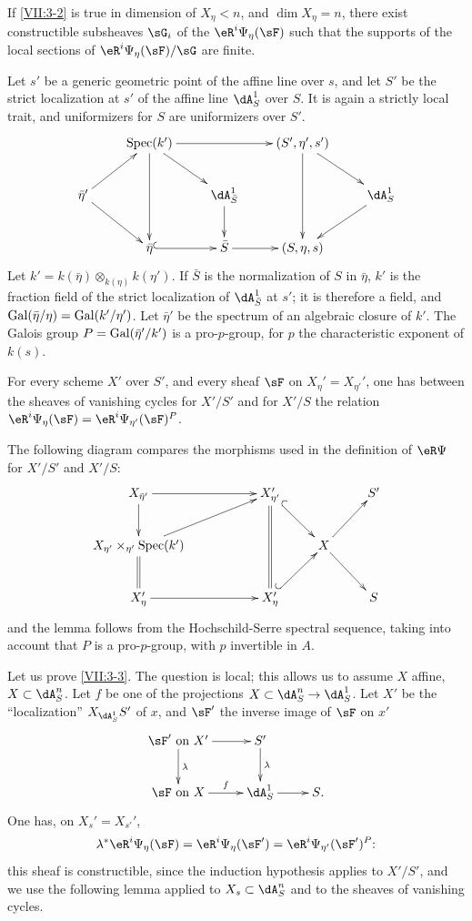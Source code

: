 \begin{lemma_}\label{VII:3-3}
If \ref{VII:3-2} is true in dimension of $X_\eta<n$, and $\dim X_\eta=n$,
there exist constructible subsheaves $\sG_i$ of the $\eR^i \Psi_\eta(\sF)$
such that the supports of the local sections of $\eR^i\Psi_\eta(\sF)/\sG$ are
finite.
\end{lemma_}

Let $s'$ be a generic geometric point of the affine line over $s$,
and let $S'$ be the strict localization at $s'$ of the affine line $\dA_S^1$ over
$S$. It is again a strictly local trait, and uniformizers for $S$
are uniformizers over $S'$.
\[\xymatrix{
  & \spec(k') \ar[rr] \ar[dd] \ar[dr]
    & & (S',\eta',s') \ar[dr] \ar[dd] \\
  \bar\eta' \ar[ur] \ar[dr]
    & & \dA_{\bar S}^1 \ar[d]
    & & \dA_S^1 \ar[dl] \\
  & \bar\eta\ar@{^{(}->}[r]
    & \bar S \ar[r]
    & (S,\eta,s)
}\]
Let $k'=k(\bar\eta)\otimes_{k(\eta)}k(\eta')$. If $\bar S$ is the normalization
of $S$ in $\bar\eta$, $k'$ is the fraction field of the strict localization
of $\dA_{\bar S}^1$ at $s'$; it is therefore a field, and
$\operatorname{Gal}(\bar\eta/\eta)=\operatorname{Gal}(k'/\eta')$. Let $\bar\eta'$ be the spectrum of an
algebraic closure of $k'$. The Galois group $P=\operatorname{Gal}(\bar\eta'/k')$ is
a pro-$p$-group, for $p$ the characteristic exponent of $k(s)$.




\begin{lemma_}\label{VII:3-4}
For every scheme $X'$ over $S'$, and every sheaf $\sF$ on
$X_\eta'=X_{\eta'}'$, one has between the sheaves of vanishing cycles for
$X'/S'$ and for $X'/S$ the relation
$\eR^i \Psi_\eta(\sF) =\eR^i\Psi_{\eta'}(\sF)^P$.
\end{lemma_}

The following diagram compares the morphisms used in the definition of
$\eR\Psi$ for $X'/S'$ and $X'/S$:
\[\xymatrix{
  X_{\bar\eta'} \ar[rr] \ar[d]
    & & X_{\eta'}' \ar@{=}[dd] \ar@{^{(}->}[dr]
    & & S' \\
  X_{\eta'}\times_{\eta'}\spec(k') \ar@{=}[d] \ar[urr]
    & & & X \ar[ur] \ar[dr] \\
  X_\eta' \ar[rr]
    & & X_\eta' \ar@{^{(}->}[ur]
    & & S
}\]
and the lemma follows from the Hochschild-Serre spectral sequence, taking into
account that $P$ is a pro-$p$-group, with $p$ invertible in $A$.

Let us prove \ref{VII:3-3}. The question is local; this allows us to assume $X$
affine, $X\subset \dA_S^n$. Let $f$ be one of the projections
$X\subset \dA_S^n\to \dA_S^1$. Let $X'$ be the ``localization'' $X_{\dA_S^1} S'$ of $x$,
and $\sF'$ the inverse image of $\sF$ on $x'$
\[\xymatrix{
  \sF'\text{ on }X' \ar[r] \ar[d]^-\lambda
    & S' \ar[d]^-\lambda \\
  \sF \text{ on }X \ar[r]^-f
    & \dA_S^1 \ar[r]
    & S \text{.}
}\]
One has, on $X_s'=X_{s'}'$,
\[
  \lambda^\ast \eR^i\Psi_\eta(\sF) = \eR^i \Psi_\eta(\sF') = \eR^i\Psi_{\eta'}(\sF')^P \text{:}
\]
this sheaf is constructible, since the induction hypothesis applies to
$X'/S'$, and we use the following lemma applied to $X_s\subset \dA_S^n$ and
to the sheaves of vanishing cycles.




